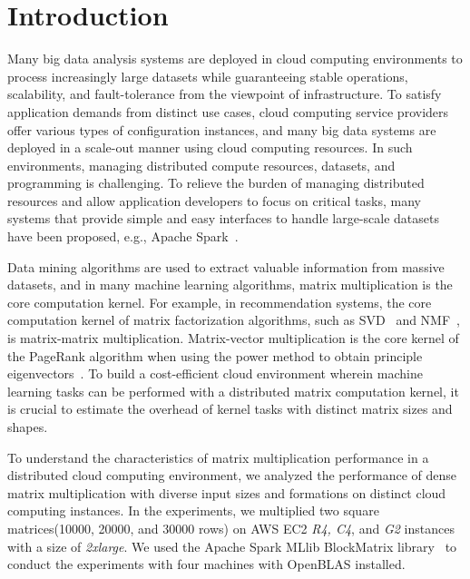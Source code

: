 \documentclass[10pt, conference, compsocconf]{IEEEtran}
\begin{document}
\IEEEpeerreviewmaketitle

\section{Introduction}\label{sec:intro}
Many big data analysis systems are deployed in cloud computing environments to process increasingly large datasets while guaranteeing stable operations, scalability, and fault-tolerance from the viewpoint of infrastructure. To satisfy application demands from distinct use cases, cloud computing service providers offer various types of configuration instances, and many big data systems are deployed in a scale-out manner using cloud computing resources. In such environments, managing distributed compute resources, datasets, and programming is challenging. To relieve the burden of managing distributed resources and allow application developers to focus on critical tasks, many systems that provide simple and easy interfaces to handle large-scale datasets have been proposed, e.g., Apache Spark~\cite{spark}.

Data mining algorithms are used to extract valuable information from massive datasets, and in many machine learning algorithms, matrix multiplication is the core computation kernel. For example, in recommendation systems, the core computation kernel of matrix factorization algorithms, such as SVD~\cite{kalman1996singularly} and NMF~\cite{nmf}, is matrix-matrix multiplication. Matrix-vector multiplication is the core kernel of the PageRank algorithm when using the power method to obtain principle eigenvectors~\cite{pagerank}. To build a cost-efficient cloud environment wherein machine learning tasks can be performed with a distributed matrix computation kernel, it is crucial to estimate the overhead of kernel tasks with distinct matrix sizes and shapes.

To understand the characteristics of matrix multiplication performance in a distributed cloud computing environment, we analyzed the performance of dense matrix multiplication with diverse input sizes and formations on distinct cloud computing instances. In the experiments, we multiplied two square matrices(10000, 20000, and 30000 rows) on AWS EC2 \textit{R4, C4}, and \textit{G2} instances with a size of \textit{2xlarge}. We used the Apache Spark MLlib BlockMatrix library~\cite{spark-mm} to conduct the experiments with four machines with OpenBLAS installed.
\end{document}
